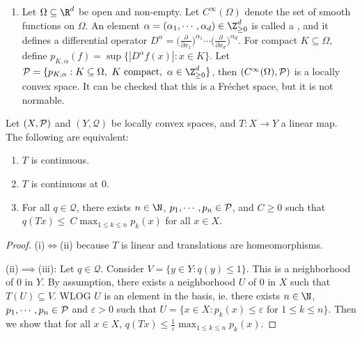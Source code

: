 \documentclass[a4paper]{article}
\begin{document}
{\begin{eg}
\begin{enumerate}[label=(\arabic*)]
		There exists a sequence of compact sets $(K_n)$ in $U$ such that $K_n\subseteq\Int K_{n+1}$ and $\bigcup K_n=U$. Such sequences are called a  of $U$. It can be checked that $\{p_{K_n}:n\in\N\}\sim\P$, so $\Oc(U)$ is metrizable. In fact, it is a , ie. a complete metrizable locally convex space.

		It is not normable: recall Montel's theorem in complex analysis states that if a sequence $(f_n)$ in $\Oc(U)$ is locally bounded, then $(f_n)$ has a convergent subsequence. If there is a norm, this would imply the unit ball is compact, which is a contradiction since $\Oc(U)$ is infinite-dimensional.
		\item Let $\Omega\subseteq\R^d$ be open and non-empty. Let $C^\infty(\Omega)$ denote the set of smooth functions on $\Omega$. An element $\alpha=(\alpha_1,\cdots,\alpha_d)\in\Z_{\geq 0}^d$ is called a , and it defines a differential operator $D^\alpha=\big(\frac{\partial}{\partial x_1}\big)^{\alpha_1}\cdots\big(\frac{\partial}{\partial x_d}\big)^{\alpha_d}$. For compact $K\subseteq\Omega$, define $p_{K,\alpha}(f)=\sup\{|D^\alpha f(x)|:x\in K\}$. Let $\P=\{p_{K,\alpha}:K\subseteq\Omega,\ K\text{ compact},\ \alpha\in\Z_{\geq 0}^d\}$, then $(C^\infty(\Omega),\P)$ is a locally convex space. It can be checked that this is a Fr\'echet space, but it is not normable.
	\end{enumerate}
\end{eg}

\begin{nlemma}\label{lem:LCSCts}
	Let $(X,\P)$ and $(Y,\mathcal{Q})$ be locally convex spaces, and $T:X\to Y$ a linear map. The following are equivalent:
	\begin{enumerate}[nosep, label=(\roman*)]
		\item $T$ is continuous.
		\item $T$ is continuous at 0.
		\item For all $q\in\mathcal{Q}$, there exists $n\in\N$, $p_1,\cdots,p_n\in\P$, and $C\geq 0$ such that $q(Tx)\leq\ C\max_{1\leq k\leq n}p_k(x)$ for all $x\in X$.
	\end{enumerate}
\end{nlemma}

\begin{proof}
  (i)$\iff$(ii) because $T$ is linear and translations are homeomorphisms.

  (ii)$\implies$(iii): Let $q\in\mathcal{Q}$. Consider $V=\{y\in Y: q(y)\leq 1\}$. This is a neighborhood of 0 in $Y$. By assumption, there exists a neighborhood $U$ of 0 in $X$ such that $T(U)\subseteq V$. WLOG $U$ is an element in the basis, ie. there exists $n\in\N$, $p_1,\cdots,p_n\in\P$ and $\varepsilon>0$ such that $U=\{x\in X:p_k(x)\leq\varepsilon\text{ for }1\leq k\leq n\}$. Then we show that for all $x\in X$, $q(Tx)\leq\frac{1}{\varepsilon}\max_{1\leq k\leq n}p_k(x)$.


\end{proof}}
\end{document}
